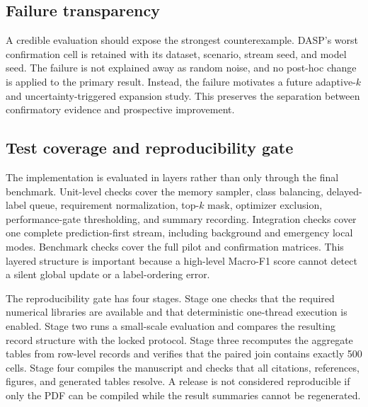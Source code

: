 \subsection{Failure transparency}
A credible evaluation should expose the strongest counterexample. DASP's worst confirmation cell is retained with its dataset, scenario, stream seed, and model seed. The failure is not explained away as random noise, and no post-hoc change is applied to the primary result. Instead, the failure motivates a future adaptive-$k$ and uncertainty-triggered expansion study. This preserves the separation between confirmatory evidence and prospective improvement.


\subsection{Test coverage and reproducibility gate}
The implementation is evaluated in layers rather than only through the final benchmark. Unit-level checks cover the memory sampler, class balancing, delayed-label queue, requirement normalization, top-$k$ mask, optimizer exclusion, performance-gate thresholding, and summary recording. Integration checks cover one complete prediction-first stream, including background and emergency local modes. Benchmark checks cover the full pilot and confirmation matrices. This layered structure is important because a high-level Macro-F1 score cannot detect a silent global update or a label-ordering error.

The reproducibility gate has four stages. Stage one checks that the required numerical libraries are available and that deterministic one-thread execution is enabled. Stage two runs a small-scale evaluation and compares the resulting record structure with the locked protocol. Stage three recomputes the aggregate tables from row-level records and verifies that the paired join contains exactly 500 cells. Stage four compiles the manuscript and checks that all citations, references, figures, and generated tables resolve. A release is not considered reproducible if only the PDF can be compiled while the result summaries cannot be regenerated.

